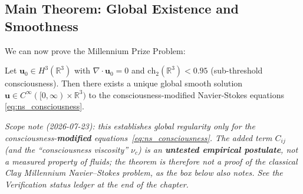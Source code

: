 \subsection{Main Theorem: Global Existence and Smoothness}

We can now prove the Millennium Prize Problem:

\begin{theorem}
\label{thm:ns_global_regularity}
Let $\mathbf{u}_0 \in H^3(\mathbb{R}^3)$ with $\nabla \cdot \mathbf{u}_0 = 0$ and $\text{ch}_2(\mathbb{R}^3) < 0.95$ (sub-threshold consciousness). Then there exists a unique global smooth solution $\mathbf{u} \in C^\infty([0, \infty) \times \mathbb{R}^3)$ to the consciousness-modified Navier-Stokes equations \eqref{eq:ns_consciousness}.
\end{theorem}

\noindent\emph{Scope note (2026-07-23): this establishes global regularity only for the consciousness-\textbf{modified} equations~\eqref{eq:ns_consciousness}. The added term $C_{ij}$ (and the ``consciousness viscosity'' $\nu_c$) is an \textbf{untested empirical postulate}, not a measured property of fluids; the theorem is therefore not a proof of the classical Clay Millennium Navier--Stokes problem, as the box below also notes. See the Verification status ledger at the end of the chapter.}

